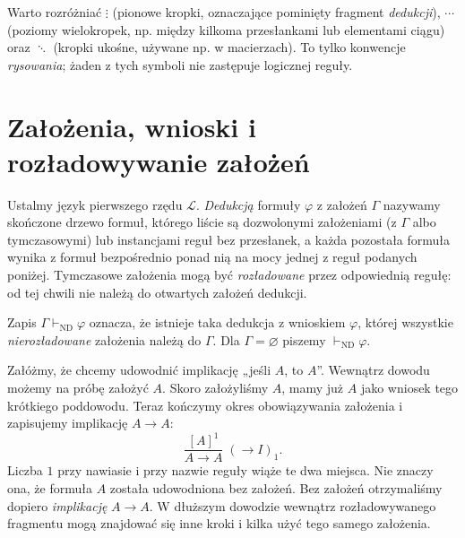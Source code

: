 \begin{uwaga}
Warto rozróżniać $\vdots$ (pionowe kropki, oznaczające
pominięty fragment \emph{dedukcji}), $\cdots$ (poziomy
wielokropek, np. między kilkoma przesłankami lub elementami
ciągu) oraz $\ddots$ (kropki ukośne, używane np.
w macierzach). To tylko konwencje \emph{rysowania};
żaden z tych symboli nie zastępuje logicznej reguły.
\end{uwaga}

\section{Założenia, wnioski i rozładowywanie założeń}
\begin{definicja}\label{def:nd-derivation}
Ustalmy język pierwszego rzędu $\mathcal L$.
\emph{Dedukcją} formuły $\varphi$ z założeń $\Gamma$ nazywamy
skończone drzewo formuł, którego liście są dozwolonymi
założeniami (z $\Gamma$ albo tymczasowymi) lub instancjami
reguł bez przesłanek, a każda pozostała formuła wynika
z formuł bezpośrednio ponad nią na mocy jednej z reguł
podanych poniżej. Tymczasowe założenia mogą być
\emph{rozładowane} przez odpowiednią regułę: od tej chwili
nie należą do otwartych założeń dedukcji.

Zapis $\Gamma\vdash_{\mathrm{ND}}\varphi$ oznacza, że istnieje
taka dedukcja z wnioskiem $\varphi$, której wszystkie
\emph{nierozładowane} założenia należą do $\Gamma$.
Dla $\Gamma=\varnothing$ piszemy $\vdash_{\mathrm{ND}}\varphi$.
\end{definicja}

\begin{przyklad}\label{ex:nd-discharge-explained}
Załóżmy, że chcemy udowodnić implikację „jeśli $A$, to $A$”.
Wewnątrz dowodu możemy na próbę założyć $A$. Skoro założyliśmy $A$,
mamy już $A$ jako wniosek tego krótkiego poddowodu. Teraz kończymy
okres obowiązywania założenia i zapisujemy implikację $A\to A$:
\[
\frac{[A]^1}{A\to A}\;(\to I)_1.
\]
Liczba $1$ przy nawiasie i przy nazwie reguły wiąże te dwa miejsca.
Nie znaczy ona, że formuła $A$ została udowodniona bez założeń.
Bez założeń otrzymaliśmy dopiero \emph{implikację} $A\to A$.
W dłuższym dowodzie wewnątrz rozładowywanego fragmentu
mogą znajdować się inne kroki i kilka użyć tego samego założenia.
\end{przyklad}


